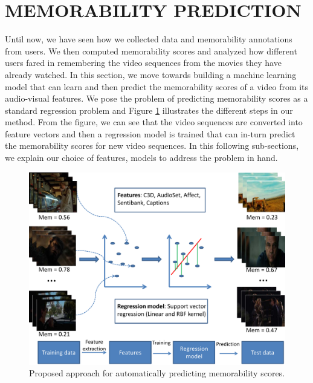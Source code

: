 \documentclass[sigconf]{acmart}
\begin{document}
\section{MEMORABILITY PREDICTION} %
Until now, we have seen how we collected data and memorability annotations from users.
We then computed memorability scores and analyzed how different users fared in remembering the video sequences from the movies they have already watched.
In this section, we move towards building a machine learning model that can learn and then predict the memorability scores of a video from its audio-visual features. 
We pose the problem of predicting memorability scores as a standard regression problem and Figure \ref{prop-apprch} illustrates the different steps in our method.
From the figure, we can see that the video sequences are converted into feature vectors and then a regression model is trained that can in-turn predict the memorability scores for new video sequences.
In this following sub-sections, we explain our choice of features, models to address the problem in hand.

\begin{figure}[h]	  
  \centering
    \includegraphics[width=0.9\columnwidth]{figures/approach.pdf}
		\caption{Proposed approach for automatically predicting memorability scores.}
    \label{prop-apprch}
\end{figure}
\end{document}
